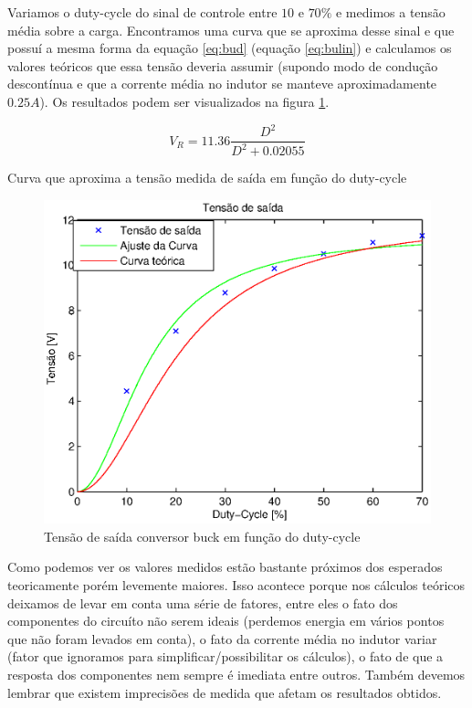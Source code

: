 \documentclass{article}
\begin{document}
Variamos o duty-cycle do sinal de controle entre $10$ e $70\%$ e medimos a tensão média sobre a carga. Encontramos uma curva que se aproxima desse sinal e que possuí a mesma forma da equação \ref{eq:bud} (equação \ref{eq:bulin}) e calculamos os valores teóricos que essa tensão deveria assumir (supondo modo de condução descontínua e que a corrente média no indutor se manteve aproximadamente $0.25 A$). Os resultados podem ser visualizados na figura \ref{fig:butvd}.

\begin{capequ}
	\begin{equation}
	V_R = 11.36\frac{D^2}{D^2 +  0.02055}	
	\end{equation}
	\caption{Curva que aproxima a tensão medida de saída em função do duty-cycle}
	\label{eq:bulin}
\end{capequ}

\begin{figure}[H]
	\centering
	\includegraphics[width=0.7\linewidth]{Dados/buck/tvd}
	\caption{Tensão de saída conversor buck em função do duty-cycle}
	\label{fig:butvd}
\end{figure}

Como podemos ver os valores medidos estão bastante próximos dos esperados teoricamente porém levemente maiores. Isso acontece porque nos cálculos teóricos deixamos de levar em conta uma série de fatores, entre eles o fato dos componentes do circuíto não serem ideais (perdemos energia em vários pontos que não foram levados em conta), o fato da corrente média no indutor variar (fator que ignoramos para simplificar/possibilitar os cálculos), o fato de que a resposta dos componentes nem sempre é imediata entre outros. Também devemos lembrar que existem imprecisões de medida que afetam os resultados obtidos.
\end{document}
